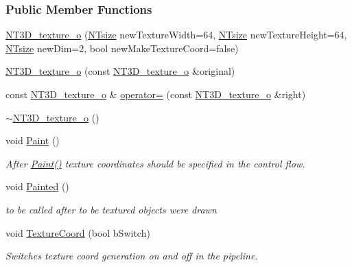 \subsubsection*{Public Member Functions}
\begin{DoxyCompactItemize}
\item 
\hyperlink{class_n_t3_d__texture__o_a56c373079bb05fc42034ab90409f71d6}{NT3D\_\-texture\_\-o} (\hyperlink{nt__types_8h_a06c124f2e4469769b58230253ce0560b}{NTsize} newTextureWidth=64, \hyperlink{nt__types_8h_a06c124f2e4469769b58230253ce0560b}{NTsize} newTextureHeight=64, \hyperlink{nt__types_8h_a06c124f2e4469769b58230253ce0560b}{NTsize} newDim=2, bool newMakeTextureCoord=false)
\item 
\hyperlink{class_n_t3_d__texture__o_ae72a5cd72284cb6ff1f490c7130e2718}{NT3D\_\-texture\_\-o} (const \hyperlink{class_n_t3_d__texture__o}{NT3D\_\-texture\_\-o} \&original)
\item 
const \hyperlink{class_n_t3_d__texture__o}{NT3D\_\-texture\_\-o} \& \hyperlink{class_n_t3_d__texture__o_adef3808610d21bfeb6faea976a8f5d70}{operator=} (const \hyperlink{class_n_t3_d__texture__o}{NT3D\_\-texture\_\-o} \&right)
\item 
\hyperlink{class_n_t3_d__texture__o_a573940396e33c6a7c9d50d316e713e52}{$\sim$NT3D\_\-texture\_\-o} ()
\item 
void \hyperlink{class_n_t3_d__texture__o_a7d74c7d3fd43620cf1315292c6b30561}{Paint} ()
\begin{DoxyCompactList}\small\item\em After \hyperlink{class_n_t3_d__texture__o_a7d74c7d3fd43620cf1315292c6b30561}{Paint()} texture coordinates should be specified in the control flow. \item\end{DoxyCompactList}\item 
void \hyperlink{class_n_t3_d__texture__o_aec31080f0bde868b529bce81170effad}{Painted} ()
\begin{DoxyCompactList}\small\item\em to be called after to be textured objects were drawn \item\end{DoxyCompactList}\item 
void \hyperlink{class_n_t3_d__texture__o_a201e79f18dab82398148df480f0f79c4}{TextureCoord} (bool bSwitch)
\begin{DoxyCompactList}\small\item\em Switches texture coord generation on and off in the pipeline. \item\end{DoxyCompactList}\end{DoxyCompactItemize}
